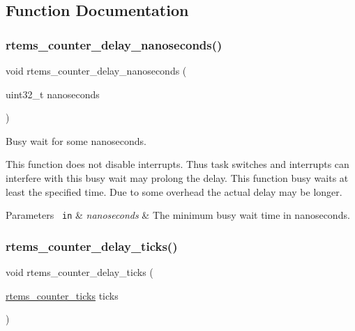 \subsection{Function Documentation}
\mbox{\label{group__ClassicCounter_gaa8fddf3e4ad1abb10170e61db04525ae}} 
\subsubsection{\texorpdfstring{rtems\_counter\_delay\_nanoseconds()}{rtems\_counter\_delay\_nanoseconds()}}
{\footnotesize\ttfamily void rtems\+\_\+counter\+\_\+delay\+\_\+nanoseconds (\begin{DoxyParamCaption}\item[{uint32\+\_\+t}]{nanoseconds }\end{DoxyParamCaption})}



Busy wait for some nanoseconds. 

This function does not disable interrupts. Thus task switches and interrupts can interfere with this busy wait may prolong the delay. This function busy waits at least the specified time. Due to some overhead the actual delay may be longer.


\begin{DoxyParams}[1]{Parameters}
\mbox{\texttt{ in}}  & {\em nanoseconds} & The minimum busy wait time in nanoseconds. \\
\hline
\end{DoxyParams}
\mbox{\label{group__ClassicCounter_gae1a4a949021ae54cf5d1c267fe0f9493}} 
\subsubsection{\texorpdfstring{rtems\_counter\_delay\_ticks()}{rtems\_counter\_delay\_ticks()}}
{\footnotesize\ttfamily void rtems\+\_\+counter\+\_\+delay\+\_\+ticks (\begin{DoxyParamCaption}\item[{\mbox{\hyperlink{group__ClassicCounter_gafda796220404920ac0af841d9f555262}{rtems\+\_\+counter\+\_\+ticks}}}]{ticks }\end{DoxyParamCaption})}



